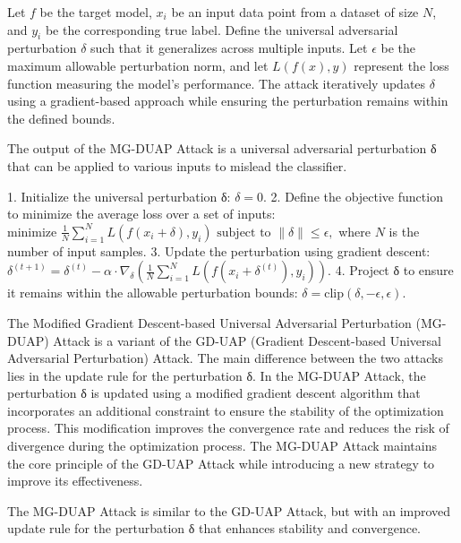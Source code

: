 Let \( f \) be the target model, \( x_i \) be an input data point from a dataset of size \( N \), and \( y_i \) be the corresponding true label.  
Define the universal adversarial perturbation \( \delta \) such that it generalizes across multiple inputs.  
Let \( \epsilon \) be the maximum allowable perturbation norm, and let \( L(f(x), y) \) represent the loss function measuring the model's performance.  
The attack iteratively updates \( \delta \) using a gradient-based approach while ensuring the perturbation remains within the defined bounds.


The output of the MG-DUAP Attack is a universal adversarial perturbation δ that can be applied to various inputs to mislead the classifier.

1. Initialize the universal perturbation δ:
   $
   \delta = 0.
   $
2. Define the objective function to minimize the average loss over a set of inputs:
   $
   \text{minimize } \frac{1}{N} \sum_{i=1}^{N} L(f(x_i + \delta), y_i) \text{ subject to } \|\delta\| \leq \epsilon,
   $
   where $N$ is the number of input samples.
3. Update the perturbation using gradient descent:
   $
   \delta^{(t+1)} = \delta^{(t)} - \alpha \cdot \nabla_{\delta} \left( \frac{1}{N} \sum_{i=1}^{N} L(f(x_i + \delta^{(t)}), y_i) \right).
   $
4. Project δ to ensure it remains within the allowable perturbation bounds:
   $
   \delta = \text{clip}(\delta, -\epsilon, \epsilon).
   $

The Modified Gradient Descent-based Universal Adversarial Perturbation (MG-DUAP) Attack is a variant of the GD-UAP (Gradient Descent-based Universal Adversarial Perturbation) Attack. The main difference between the two attacks lies in the update rule for the perturbation δ. In the MG-DUAP Attack, the perturbation δ is updated using a modified gradient descent algorithm that incorporates an additional constraint to ensure the stability of the optimization process. This modification improves the convergence rate and reduces the risk of divergence during the optimization process. The MG-DUAP Attack maintains the core principle of the GD-UAP Attack while introducing a new strategy to improve its effectiveness.

The MG-DUAP Attack is similar to the GD-UAP Attack, but with an improved update rule for the perturbation δ that enhances stability and convergence.